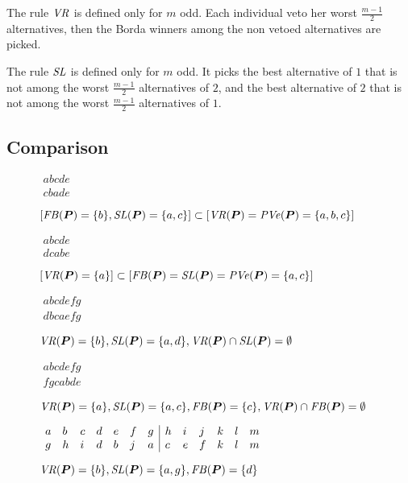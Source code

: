 \documentclass[version=3.21, pagesize, twoside=off, bibliography=totoc, DIV=calc, fontsize=12pt, a4paper]{scrartcl}
\begin{document}
The rule $\mathit{VR}$ is defined only for $m$ odd. Each individual veto her worst $\frac{m - 1}{2}$ alternatives, then the Borda winners among the non vetoed alternatives are picked.

The rule $\mathit{SL}$ is defined only for $m$ odd. It picks the best alternative of $1$ that is not among the worst $\frac{m - 1}{2}$ alternatives of $2$, and the best alternative of $2$ that is not among the worst $\frac{m - 1}{2}$ alternatives of $1$.

\subsection{Comparison}
\begin{figure}
	\caption{$[\mathit{FB}(\bm{P}) = \{b\}, \mathit{SL}(\bm{P}) = \{a, c\}] \subset [\mathit{VR}(\bm{P}) = \mathit{PVe}(\bm{P}) = \{a, b, c\}]$}
	\label{fig:cbade}
	$\begin{array}{l}
		abcde\\
		cbade
	\end{array}$
\end{figure}
\begin{figure}
	\caption{$[\mathit{VR}(\bm{P}) = \{a\}] \subset [\mathit{FB}(\bm{P}) = \mathit{SL}(\bm{P}) = \mathit{PVe}(\bm{P}) = \{a, c\}]$}
	\label{fig:dcabe}
	$\begin{array}{l}
		abcde\\
		dcabe
	\end{array}$
\end{figure}
\begin{figure}
	\caption{$\mathit{VR}(\bm{P}) = \{b\}, \mathit{SL}(\bm{P}) = \{a, d\}, \mathit{VR}(\bm{P}) \cap \mathit{SL}(\bm{P}) = \emptyset$}
	\label{fig:dbcaefg}
	$\begin{array}{l}
		abcdefg\\
		dbcaefg
	\end{array}$
\end{figure}
\begin{figure}
	\caption{$\mathit{VR}(\bm{P}) = \{a\}, \mathit{SL}(\bm{P}) = \{a, c\}, \mathit{FB}(\bm{P}) = \{c\}, \mathit{VR}(\bm{P}) \cap \mathit{FB}(\bm{P}) = \emptyset$}
	\label{fig:fgcabde}
	$\begin{array}{l}
		abcdefg\\
		fgcabde
	\end{array}$
\end{figure}
\begin{figure}
	\caption{$\mathit{VR}(\bm{P}) = \{b\}, \mathit{SL}(\bm{P}) = \{a, g\}, \mathit{FB}(\bm{P}) = \{d\}$}
	\label{fig:disjoint}
	$\begin{array}{llll lll | llll ll}
		a&b&c&d&e&f&g&h&i&j&k&l&m\\
		g&h&i&d&b&j&a&c&e&f&k&l&m\\
	\end{array}$
\end{figure}
\end{document}
